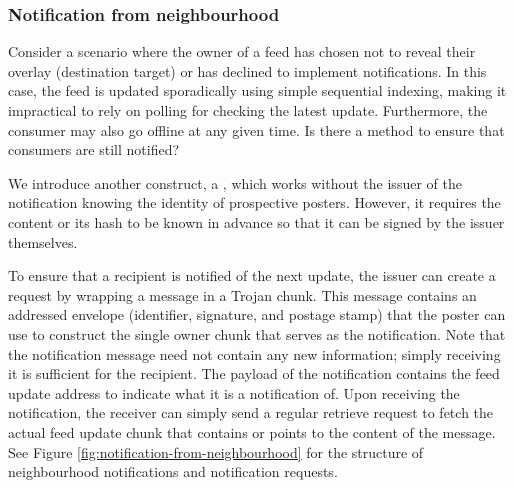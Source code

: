 \subsubsection{Notification from neighbourhood}

Consider a scenario where the owner of a feed has chosen not to reveal their overlay (destination target) or has declined to implement notifications. In this case, the feed is updated sporadically using simple sequential indexing, making it impractical to rely on polling for checking the latest update. Furthermore, the consumer may also go offline at any given time.
Is there a method to ensure that consumers are still notified? 

We introduce another construct, a , which works without the issuer of the notification knowing the identity of prospective posters. However, it requires the content or its hash to be known in advance so that it can be signed by the issuer themselves.


To ensure that a recipient is notified of the next update, the issuer can create a  request by wrapping  a message in a Trojan chunk. This message contains an addressed envelope (identifier, signature, and postage stamp) that the poster can use to construct the single owner chunk that serves as the notification. Note that the notification message need not contain any new information; simply receiving it is sufficient for the recipient. The payload of the notification contains the feed update address to indicate what it is a notification of. Upon receiving the notification, the receiver can simply send a regular retrieve request to fetch the actual feed update chunk that contains or points to the content of the message. See Figure \ref{fig:notification-from-neighbourhood} for the structure of neighbourhood notifications and notification requests.
                                

